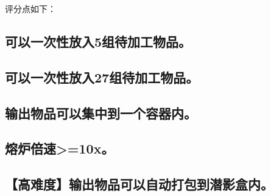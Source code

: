 \documentclass{exampaper}
\begin{document}
            评分点如下：

            \subsection{可以一次性放入5组待加工物品。}

            \subsection{可以一次性放入27组待加工物品。}

            \subsection{输出物品可以集中到一个容器内。}

            \subsection{熔炉倍速>=10x。}

            \subsection{【高难度】输出物品可以自动打包到潜影盒内。}
\end{document}
